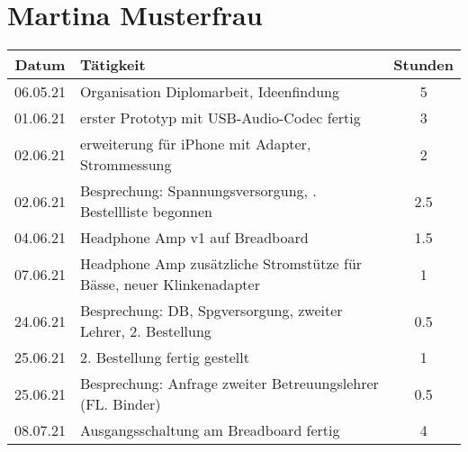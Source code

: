 \section{Martina Musterfrau}
\begin{longtable}{c|p{10cm}|c}
    \textbf{Datum} & \textbf{Tätigkeit}                                                                                     & \textbf{Stunden} \\ \hline \hline
    06.05.21       & Organisation Diplomarbeit, Ideenfindung                                                                & 5                     \\ \hline
    01.06.21       & erster Prototyp mit USB-Audio-Codec fertig                                                             & 3                     \\ \hline
    02.06.21       & erweiterung für iPhone mit Adapter, Strommessung                                                       & 2                     \\ \hline
    02.06.21       & Besprechung: Spannungsversorgung, \newline 1. Bestellliste begonnen                                             & 2.5                   \\ \hline
    04.06.21       & Headphone Amp v1 auf Breadboard                                                                        & 1.5                   \\ \hline
    07.06.21       & Headphone Amp zusätzliche Stromstütze für Bässe, \newline neuer   Klinkenadapter                                & 1                     \\ \hline
    24.06.21       & Besprechung: DB, Spgversorgung, \newline zweiter Lehrer, 2. Bestellung                                          & 0.5                   \\ \hline
    25.06.21       & 2. Bestellung fertig gestellt                                                                          & 1                     \\ \hline
    25.06.21       & Besprechung: Anfrage zweiter \newline Betreuungslehrer (FL. Binder)                                             & 0.5                   \\ \hline
    08.07.21       & Ausgangsschaltung am Breadboard fertig                                                                 & 4                     \\ \hline

\end{longtable}
